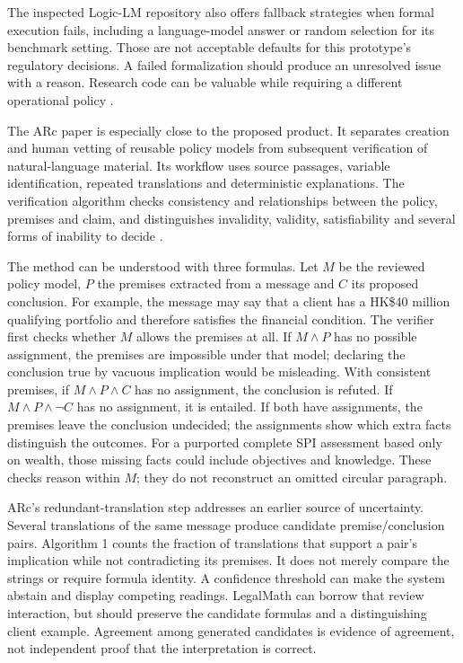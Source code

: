 \documentclass[12pt,a4paper,oneside,openany]{book}
\begin{document}
The inspected Logic-LM repository also offers fallback strategies when formal
execution fails, including a language-model answer or random selection for its
benchmark setting. Those are not acceptable defaults for this prototype's
regulatory decisions. A failed formalization should produce an unresolved issue
with a reason. Research code can be valuable while requiring a different
operational policy \citep{libraryreview}.

The ARc paper is especially close to the proposed product. It separates creation
and human vetting of reusable policy models from subsequent verification of
natural-language material. Its workflow uses source passages, variable
identification, repeated translations and deterministic explanations. The
verification algorithm checks consistency and relationships between the policy,
premises and claim, and distinguishes invalidity, validity, satisfiability and
several forms of inability to decide
\citep[sec.~3 and Algorithm~1]{arc2025}.

The method can be understood with three formulas. Let $M$ be the reviewed policy
model, $P$ the premises extracted from a message and $C$ its proposed conclusion.
For example, the message may say that a client has a HK\$40 million qualifying
portfolio and therefore satisfies the financial condition. The verifier first
checks whether $M$ allows the premises at all. If $M\land P$ has no possible
assignment, the premises are impossible under that model; declaring the
conclusion true by vacuous implication would be misleading. With consistent
premises, if $M\land P\land C$ has no assignment, the conclusion is refuted.
If $M\land P\land\neg C$ has no assignment, it is entailed. If both have
assignments, the premises leave the conclusion undecided; the assignments show
which extra facts distinguish the outcomes. For a purported complete SPI
assessment based only on wealth, those missing facts could include objectives
and knowledge. These checks reason within $M$; they do not reconstruct an
omitted circular paragraph.

ARc's redundant-translation step addresses an earlier source of uncertainty.
Several translations of the same message produce candidate premise/conclusion
pairs. Algorithm 1 counts the fraction of translations that support a pair's
implication while not contradicting its premises. It does not merely compare
the strings or require formula identity. A confidence threshold can make the
system abstain and display competing readings. LegalMath can borrow that
review interaction, but should preserve the candidate formulas and a
distinguishing client example. Agreement among generated candidates is evidence
of agreement, not independent proof that the interpretation is correct.
\end{document}
